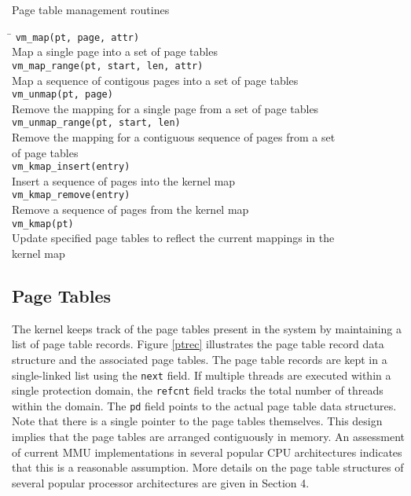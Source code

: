 \begin{table}[h]
\caption{\label{vmroutines} Page table management routines}
\begin{tabbing}
\hspace{0.25in} \= \kill
{\tt vm\_map(pt, page, attr)} \\
\> Map a single page into a set of page tables \\

{\tt vm\_map\_range(pt, start, len, attr)} \\
\> Map a sequence of contigous pages into a set of page tables \\

{\tt vm\_unmap(pt, page)} \\
\> Remove the mapping for a single page from a set of page tables \\

{\tt vm\_unmap\_range(pt, start, len)} \\
\> Remove the mapping for a contiguous sequence of pages from a set \\
\> of page tables \\

{\tt vm\_kmap\_insert(entry)} \\
\> Insert a sequence of pages into the kernel map \\

{\tt vm\_kmap\_remove(entry)} \\
\> Remove a sequence of pages from the kernel map \\

{\tt vm\_kmap(pt)} \\
\> Update specified page tables to reflect the current mappings in the \\
\> kernel map \\
\end{tabbing} \end{table}


\subsection{Page Tables}

The kernel keeps track of the page tables present in the
system by maintaining a list of page table records.  Figure
\ref{ptrec} illustrates the page table record data structure
and the associated page tables.  The page table records are
kept in a single-linked list using the {\tt next} field.
If multiple threads are executed within a single protection
domain, the {\tt refcnt} field tracks the total number of
threads within the domain.  The {\tt pd} field points to
the actual page table data structures.  Note that there
is a single pointer to the page tables themselves.  This
design implies that the page tables are arranged contiguously
in memory.  An assessment of current MMU implementations in
several popular CPU architectures indicates that this is
a reasonable assumption.  More details on the page table
structures of several popular processor architectures are
given in Section 4.

